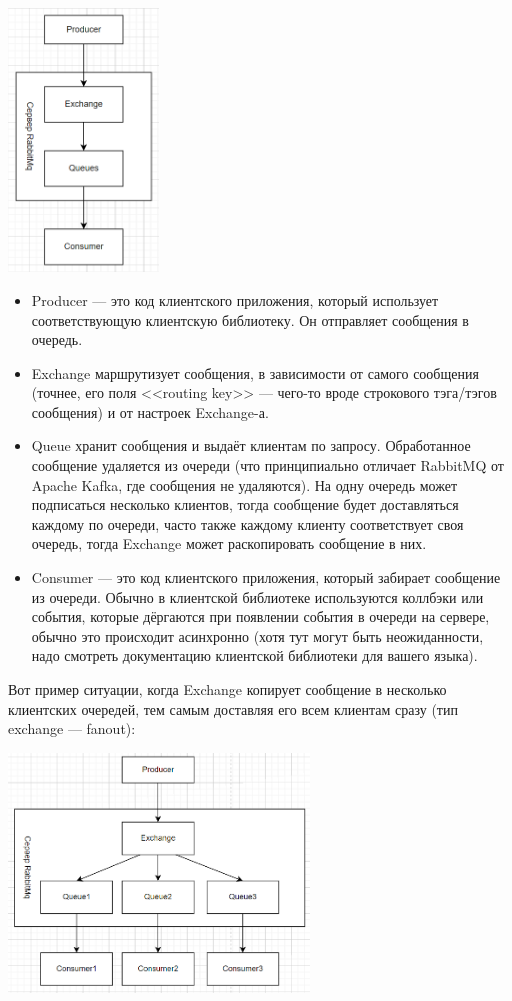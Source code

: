 \documentclass[a5paper]{article}
\begin{document}
\begin{center}
\includegraphics[width=0.3\textwidth]{rabbitMqArchitecture.png}
\end{center}

\begin{itemize}
    \item Producer --- это код клиентского приложения, который использует соответствующую клиентскую библиотеку. Он отправляет сообщения в очередь. 
    \item Exchange маршрутизует сообщения, в зависимости от самого сообщения (точнее, его поля <<routing key>> --- чего-то вроде строкового тэга/тэгов сообщения) и от настроек Exchange-а.
    \item Queue хранит сообщения и выдаёт клиентам по запросу. Обработанное сообщение удаляется из очереди (что принципиально отличает RabbitMQ от Apache Kafka, где сообщения не удаляются). На одну очередь может подписаться несколько клиентов, тогда сообщение будет доставляться каждому по очереди, часто также каждому клиенту соответствует своя очередь, тогда Exchange может раскопировать сообщение в них.
    \item Consumer --- это код клиентского приложения, который забирает сообщение из очереди. Обычно в клиентской библиотеке используются коллбэки или события, которые дёргаются при появлении события в очереди на сервере, обычно это происходит асинхронно (хотя тут могут быть неожиданности, надо смотреть документацию клиентской библиотеки для вашего языка).
\end{itemize}

Вот пример ситуации, когда Exchange копирует сообщение в несколько клиентских очередей, тем самым доставляя его всем клиентам сразу (тип exchange --- fanout):

\begin{center}
    \includegraphics[width=0.6\textwidth]{fanoutExchange.png}
\end{center}
\end{document}
